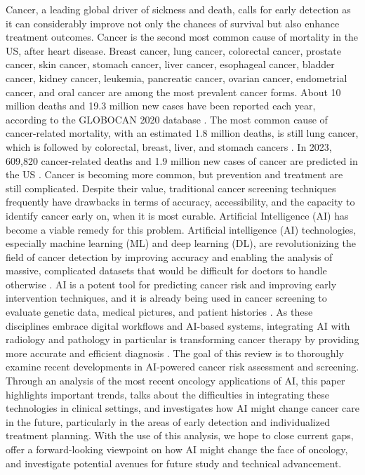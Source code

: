 \documentclass[conference]{IEEEtran}
\begin{document}
Cancer, a leading global driver of sickness and death, calls for early detection as it can considerably improve not only the chances of survival but also enhance treatment outcomes. Cancer is the second most common cause of mortality in the US, after heart disease. Breast cancer, lung cancer, colorectal cancer, prostate cancer, skin cancer, stomach cancer, liver cancer, esophageal cancer, bladder cancer, kidney cancer, leukemia, pancreatic cancer, ovarian cancer, endometrial cancer, and oral cancer are among the most prevalent cancer forms. About 10 million deaths and 19.3 million new cases have been reported each year, according to the GLOBOCAN 2020 database \cite{2}. The most common cause of cancer-related mortality, with an estimated 1.8 million deaths, is still lung cancer, which is followed by colorectal, breast, liver, and stomach cancers \cite{2}. In 2023, 609,820 cancer-related deaths and 1.9 million new cases of cancer are predicted in the US \cite{1}. Cancer is becoming more common, but prevention and treatment are still complicated. Despite their value, traditional cancer screening techniques frequently have drawbacks in terms of accuracy, accessibility, and the capacity to identify cancer early on, when it is most curable. Artificial Intelligence (AI) has become a viable remedy for this problem. Artificial intelligence (AI) technologies, especially machine learning (ML) and deep learning (DL), are revolutionizing the field of cancer detection by improving accuracy and enabling the analysis of massive, complicated datasets that would be difficult for doctors to handle otherwise \cite{15}. AI is a potent tool for predicting cancer risk and improving early intervention techniques, and it is already being used in cancer screening to evaluate genetic data, medical pictures, and patient histories \cite{5}. As these disciplines embrace digital workflows and AI-based systems, integrating AI with radiology and pathology in particular is transforming cancer therapy by providing more accurate and efficient diagnosis \cite{16}. The goal of this review is to thoroughly examine recent developments in AI-powered cancer risk assessment and screening. Through an analysis of the most recent oncology applications of AI, this paper highlights important trends, talks about the difficulties in integrating these technologies in clinical settings, and investigates how AI might change cancer care in the future, particularly in the areas of early detection and individualized treatment planning. With the use of this analysis, we hope to close current gaps, offer a forward-looking viewpoint on how AI might change the face of oncology, and investigate potential avenues for future study and technical advancement.
\end{document}
